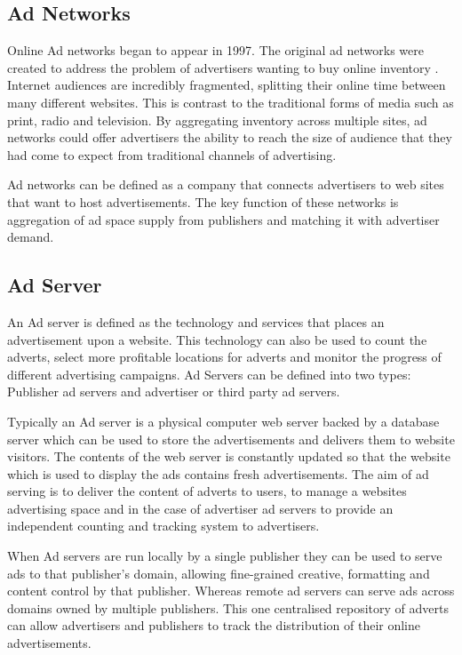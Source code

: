 \documentclass{article}
\begin{document}
\subsection{Ad Networks} \label{AdNetwork}
Online Ad networks began to appear in 1997. The original ad networks were created to address the problem of advertisers wanting to buy online inventory \parencite{adExchanges}. Internet audiences are incredibly fragmented, splitting their online time between many different websites. This is contrast to the traditional forms of media such as print, radio and television. By aggregating inventory across multiple sites, ad networks could offer advertisers the ability to reach the size of audience that they had come to expect from traditional channels of advertising. \newline

Ad networks can be defined as a company that connects advertisers to web sites that want to host advertisements. The key function of these networks is aggregation of ad space supply from publishers and matching it with advertiser demand. 

\subsection{Ad Server}
An Ad server is defined as the technology and services that places an advertisement upon a website. This technology can also be used to count the adverts, select more profitable locations for adverts and monitor the progress of different advertising campaigns. Ad Servers can be defined into two types: Publisher ad servers and advertiser or third party ad servers. \newline 

Typically an Ad server is a physical computer web server backed by a database server which can be used to store the advertisements and delivers them to website visitors. The contents of the web server is constantly updated so that the website which is used to display the ads contains fresh advertisements. The aim of ad serving is to deliver the content of adverts to users, to manage a websites advertising space and in the case of advertiser ad servers to provide an independent counting and tracking system to advertisers. \newline 

When Ad servers are run locally by a single publisher they can be used to serve ads to that publisher's domain, allowing fine-grained creative, formatting and content control by that publisher. Whereas remote ad servers can serve ads across domains owned by multiple publishers. This one centralised repository of adverts can allow advertisers and publishers to track the distribution of their online advertisements. 
\newline
\end{document}
